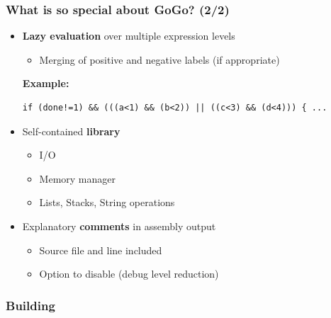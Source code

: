 \documentclass{beamer}
\begin{document}
\begin{frame}[containsverbatim]
    \frametitle{What is so special about GoGo? (2/2)}
    \begin{itemize}
        \item \textbf{Lazy evaluation} over multiple expression levels\\
            \begin{itemize}
                \item Merging of positive and negative labels (if appropriate)
            \end{itemize} 
            \tiny \textbf{Example:} \normalsize
            \begin{lstlisting}
if (done!=1) && (((a<1) && (b<2)) || ((c<3) && (d<4))) { ...
            \end{lstlisting}
        \item Self-contained \textbf{library}
            \begin{itemize}
                \item I/O 
                \item Memory manager
                \item Lists, Stacks, String operations
            \end{itemize}
        \item  Explanatory \textbf{comments} in assembly output\\
            \begin{itemize}
                \item Source file and line included
                \item Option to disable (debug level reduction)
            \end{itemize}
    \end{itemize}
\end{frame}

\begin{frame}
    \frametitle{Building}
\end{frame}

\end{document}

